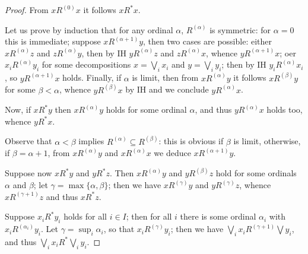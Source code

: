 \begin{proof}
From $xR^{(0)}x$ it follows $xR^{*}x$.

Let us prove by induction that for any ordinal $\alpha$, $R^{(\alpha)}$ is symmetric:
for $\alpha=0$ this is immediate; suppose $xR^{(\alpha+1)}y$, then two cases are possible: either $xR^{(\alpha)}z$ and $zR^{(\alpha)}y$, then by IH 
$yR^{(\alpha)}z$ and $zR^{(\alpha)}x$, whence $yR^{(\alpha+1)}x$; oer
$x_{i}R^{(\alpha)}y_{i}$ for some decompositions $x=\bigvee_{i}x_{i}$ and $y=\bigvee_{i}y_{i}$; then by IH $y_{i}R^{(\alpha)}x_{i}$, so $yR^{(\alpha+1)}x$ holds.
Finally, if $\alpha$ is limit, then from $x R^{(\alpha)}y$ it follows
$xR^{(\beta)}y$ for some $\beta<\alpha$, whence 
$yR^{(\beta)}x$ by IH and we conclude $yR^{(\alpha)}x$.

Now, if $xR^{*}y$ then $xR^{(\alpha)}y$ holds for some ordinal $\alpha$, and thus $yR^{(\alpha)}x$ holds too, whence $yR^{*}x$.


Observe that $\alpha<\beta$ implies $R^{(\alpha)}\subseteq R^{(\beta)}$:
this is obvious if $\beta$ is limit, otherwise, if $\beta=\alpha+1$, from $xR^{(\alpha)}y$ and $x R^{(\alpha)}x$ we deduce
$xR^{(\alpha+1)}y$.


Suppose now $xR^{*}y$ and $yR^{*}z$. Then $xR^{(\alpha)}y$ and $yR^{(\beta)}z$ hold for some 
ordinals $\alpha$ and $\beta$; let $\gamma=\max\{\alpha,\beta\}$; then 
we have $xR^{(\gamma)}y$ and $yR^{(\gamma)}z$, whence $xR^{(\gamma+1)}z$ and thus 
$xR^{*}z$.


Suppose $x_{i}R^{*}y_{i}$ holds for all $i\in I$; then 
for all $i$ there is some ordinal $\alpha_{i}$ with 
$x_{i}R^{(\alpha_{i})}y_{i}$. 
Let $\gamma=\sup_{i}\alpha_{i}$, so that 
$x_{i}R^{(\gamma)}y_{i}$; then we have
$\bigvee_{i}x_{i} R^{(\gamma+1)}\bigvee y_{i}$, and thus
$\bigvee_{i}x_{i} R^{*}\bigvee_{i}y_{i}$.

%
%
 

\end{proof}
